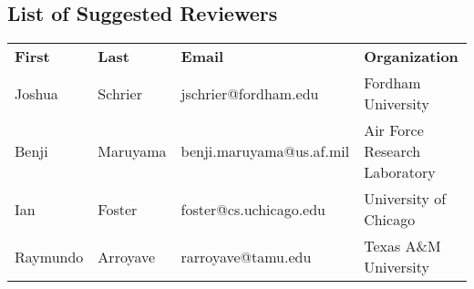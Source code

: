 \subsection*{List of Suggested Reviewers}

\begin{tabular}[c]{llll}
\textbf{First} & \textbf{Last} & \textbf{Email} & \textbf{Organization}\\
Joshua & Schrier & jschrier@fordham.edu & Fordham University\\
Benji & Maruyama & benji.maruyama@us.af.mil & Air Force Research Laboratory\\
Ian & Foster & foster@cs.uchicago.edu & University of Chicago\\
Raymundo & Arroyave & rarroyave@tamu.edu & Texas A\&M University\\
\end{tabular}